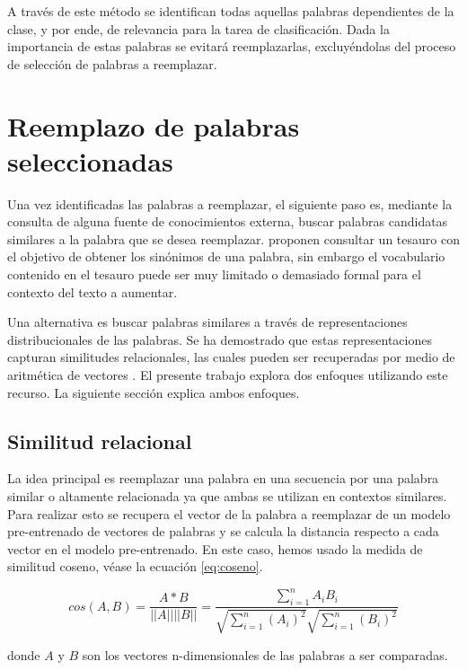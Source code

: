 A través de este método se identifican todas aquellas palabras dependientes de la clase, y por ende, de relevancia para la tarea de clasificación. Dada la importancia de estas palabras se evitará reemplazarlas, excluyéndolas del proceso de selección de palabras a reemplazar.

\section{Reemplazo de palabras seleccionadas}

Una vez identificadas las palabras a reemplazar, el siguiente paso es, mediante la consulta de alguna fuente de conocimientos externa, buscar palabras candidatas similares a la palabra que se desea reemplazar. \citep{zhang2015character} proponen consultar un tesauro con el objetivo de obtener los sinónimos de una palabra, sin embargo el vocabulario contenido en el tesauro puede ser muy limitado o demasiado formal para el contexto del texto a aumentar. 

Una alternativa es buscar palabras similares a través de representaciones distribucionales de las palabras. Se ha demostrado que estas representaciones capturan  similitudes relacionales, las cuales pueden ser recuperadas por medio de aritmética de vectores \citep{levy2014linguistic}. El presente trabajo explora dos enfoques utilizando este recurso. La siguiente sección explica ambos enfoques. 

\subsection{Similitud relacional}
La idea principal es reemplazar una palabra en una secuencia por una palabra similar o altamente relacionada ya que ambas se utilizan en contextos similares. Para realizar esto se recupera el vector de la palabra a reemplazar de un modelo pre-entrenado de vectores de palabras y se calcula la distancia respecto a cada vector en el modelo pre-entrenado. En este caso, hemos usado la medida de similitud coseno, véase la ecuación \ref{eq:coseno}.

\begin{equation}
\label{eq:coseno}
    cos(A,B)=\frac{A*B}{||A||||B||} = \frac{\sum_{i=1}^{n}A_i B_i}{\sqrt{\sum_{i=1}^{n}(A_i)^2} \sqrt{\sum_{i=1}^{n}(B_i)^2} }
\end{equation}

donde $A$ y $B$ son los vectores n-dimensionales de las palabras a ser comparadas.

